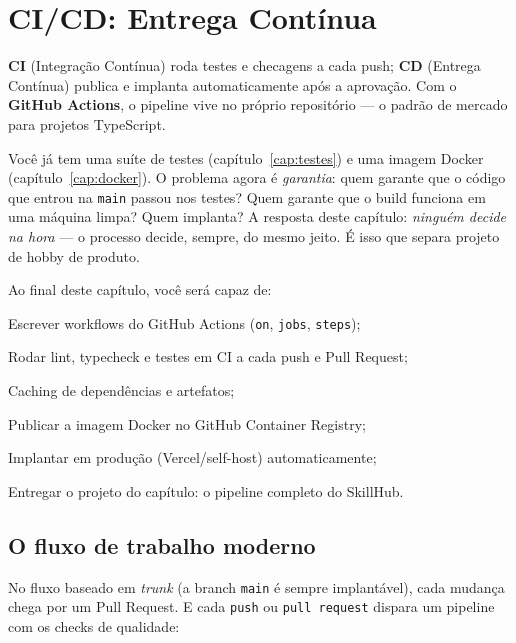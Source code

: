 \chapter{CI/CD: Entrega Contínua}
\label{cap:cicd}

\begin{caixaconceito}
\textbf{CI} (Integração Contínua) roda testes e checagens a cada push;
\textbf{CD} (Entrega Contínua) publica e implanta automaticamente após a
aprovação. Com o \textbf{GitHub Actions}, o pipeline vive no próprio
repositório — o padrão de mercado para projetos TypeScript.
\end{caixaconceito}

Você já tem uma suíte de testes (capítulo~\ref{cap:testes}) e uma imagem
Docker (capítulo~\ref{cap:docker}). O problema agora é \emph{garantia}: quem
garante que o código que entrou na \texttt{main} passou nos testes? Quem
garante que o build funciona em uma máquina limpa? Quem implanta? A resposta
deste capítulo: \emph{ninguém decide na hora} — o processo decide, sempre, do
mesmo jeito. É isso que separa projeto de hobby de produto.

Ao final deste capítulo, você será capaz de:
\begin{objetivos}
  \item Escrever workflows do GitHub Actions (\texttt{on}, \texttt{jobs}, \texttt{steps});
  \item Rodar lint, typecheck e testes em CI a cada push e Pull Request;
  \item Caching de dependências e artefatos;
  \item Publicar a imagem Docker no GitHub Container Registry;
  \item Implantar em produção (Vercel/self-host) automaticamente;
  \item Entregar o projeto do capítulo: o pipeline completo do SkillHub.
\end{objetivos}

\section{O fluxo de trabalho moderno}

No fluxo baseado em \emph{trunk} (a branch \texttt{main} é sempre
implantável), cada mudança chega por um Pull Request. E cada \texttt{push} ou
\texttt{pull request} dispara um pipeline com os checks de qualidade:

